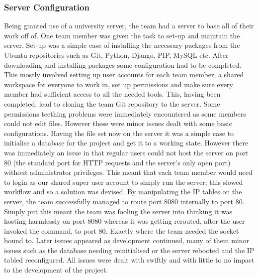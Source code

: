 \documentclass{l3proj}
\begin{document}
\subsubsection{Server Configuration}
Being granted use of a university server, the team had a server to base all of their work off of. One team member was given the task to set-up and maintain the server.
Set-up was a simple case of installing the necessary packages from the Ubuntu repositories such as Git, Python, Django, PIP, MySQL etc. After downloading and installing packages some configuration had to be completed. This mostly involved setting up user accounts for each team member, a shared workspace for everyone to work in, set up permissions and make sure every member had sufficient access to all the needed tools.
This, having been completed, lead to cloning the team Git repository to the server. Some permissions teething problems were immediately encountered as some members could not edit files. However these were minor issues dealt with some basic configurations.
Having the file set now on the server it was a simple case to initialise a database for the project and get it to a working state. However there was immediately an issue in that regular users could not host the server on port 80 (the standard port for HTTP requests and the server's only open port) without administrator privileges. This meant that each team member would need to login as our shared super user account to simply run the server; this slowed workflow and so a solution was devised. By manipulating the IP tables on the server, the team successfully managed to route port 8080 internally to port 80. Simply put this meant the team was fooling the server into thinking it was hosting harmlessly on port 8080 whereas it was getting rerouted, after the user invoked the command, to port 80. Exactly where the team needed the socket bound to.
Later issues appeared as development continued, many of them minor issues such as the database needing reinitialised or the server rebooted and the IP tabled reconfigured. All issues were dealt with swiftly and with little to no impact to the development of the project.
\end{document}
